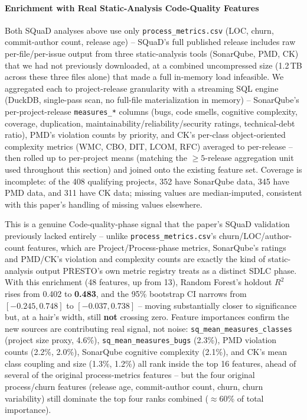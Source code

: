 \documentclass[technologies,article,submit,pdftex,moreauthors]{Definitions/mdpi}
\begin{document}
\paragraph{Enrichment with Real Static-Analysis Code-Quality Features}\label{sec:squad_enriched}

Both SQuaD analyses above use only \texttt{process\_\allowbreak metrics.csv} (LOC, churn,
commit-author count, release age) -- SQuaD's full published release
includes raw per-file/per-issue output from three static-analysis tools
(SonarQube, PMD, CK) that we had not previously downloaded, at a
combined uncompressed size (1.2\,TB across these three files alone)
that made a full in-memory load infeasible. We aggregated each to
project-release granularity with a streaming SQL engine (DuckDB,
single-pass scan, no full-file materialization in memory) -- SonarQube's
per-project-release \texttt{measures\_*} columns (bugs, code smells,
cognitive complexity, coverage, duplication,
maintainability/reliability/security ratings, technical-debt ratio),
PMD's violation counts by priority, and CK's per-class object-oriented
complexity metrics (WMC, CBO, DIT, LCOM, RFC) averaged to per-release --
then rolled up to per-project means (matching the \(\geq 5\)-release
aggregation unit used throughout this section) and joined onto the
existing feature set. Coverage is incomplete: of the 408 qualifying
projects, 352 have SonarQube data, 345 have PMD data, and 311 have CK
data; missing values are median-imputed, consistent with this paper's
handling of missing values elsewhere.

This is a genuine Code-quality-phase signal that the paper's SQuaD
validation previously lacked entirely -- unlike
\texttt{process\_\allowbreak metrics.csv}'s churn/LOC/author-count features, which are
Project/Process-phase metrics, SonarQube's ratings and PMD/CK's
violation and complexity counts are exactly the kind of static-analysis
output PRESTO's own metric registry treats as a distinct SDLC phase.
With this enrichment (48 features, up from 13), Random Forest's holdout
\(R^2\) rises from 0.402 to \textbf{0.483}, and the 95\% bootstrap CI
narrows from \([-0.245, 0.748]\) to \([-0.037, 0.738]\) -- moving
substantially closer to significance but, at a hair's width, still
\textbf{not} crossing zero. Feature importances confirm the new sources
are contributing real signal, not noise: \texttt{sq\_\allowbreak mean\_\allowbreak measures\_\allowbreak classes}
(project size proxy, 4.6\%), \texttt{sq\_\allowbreak mean\_\allowbreak measures\_\allowbreak bugs} (2.3\%),
PMD violation counts (2.2\%, 2.0\%), SonarQube cognitive complexity
(2.1\%), and CK's mean class coupling and size (1.3\%, 1.2\%) all rank
inside the top 16 features, ahead of several of the original
process-metrics features -- but the four original process/churn
features (release age, commit-author count, churn, churn variability)
still dominate the top four ranks combined (\(\approx\)60\% of total
importance).
\end{document}
